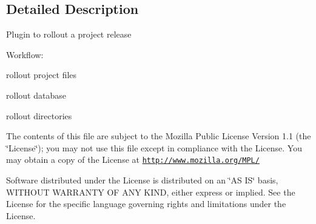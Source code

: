 \subsection{Detailed Description}
Plugin to rollout a project release

Workflow:


\begin{DoxyItemize}
\item rollout project files
\item rollout database
\item rollout directories
\end{DoxyItemize}

The contents of this file are subject to the Mozilla Public License Version 1.1 (the \char`\"{}License\char`\"{}); you may not use this file except in compliance with the License. You may obtain a copy of the License at \href{http://www.mozilla.org/MPL/}{\tt http://www.mozilla.org/MPL/}

Software distributed under the License is distributed on an \char`\"{}AS IS\char`\"{} basis, WITHOUT WARRANTY OF ANY KIND, either express or implied. See the License for the specific language governing rights and limitations under the License. 